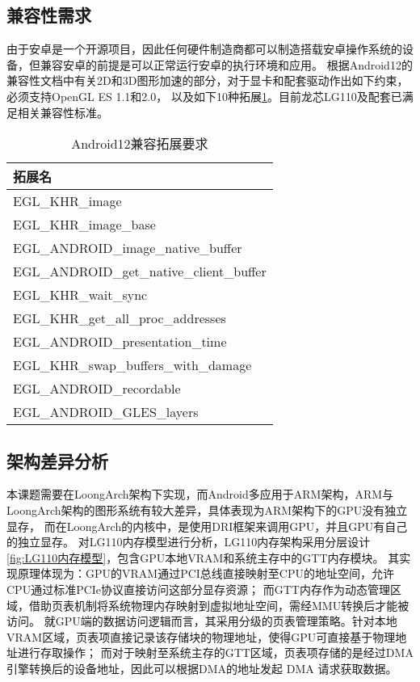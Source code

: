 \subsection{兼容性需求}
由于安卓是一个开源项目，因此任何硬件制造商都可以制造搭载安卓操作系统的设备，但兼容安卓的前提是可以正常运行安卓的执行环境和应用。
根据Android12的兼容性文档\cite{Android12CDD}中有关2D和3D图形加速的部分，对于显卡和配套驱动作出如下约束，必须支持OpenGL ES 1.1和2.0，
以及如下10种拓展\ref{tab:Android12兼容拓展要求}。目前龙芯LG110及配套已满足相关兼容性标准。

\begin{table}[h]
  \centering
  \caption{Android12兼容拓展要求}
  \label{tab:Android12兼容拓展要求}
  \begin{tabular}{l}
    \toprule
    拓展名  \\
    \midrule
    EGL\_KHR\_image \\
    EGL\_KHR\_image\_base \\
    EGL\_ANDROID\_image\_native\_buffer \\
    EGL\_ANDROID\_get\_native\_client\_buffer \\
    EGL\_KHR\_wait\_sync \\
    EGL\_KHR\_get\_all\_proc\_addresses \\
    EGL\_ANDROID\_presentation\_time \\
    EGL\_KHR\_swap\_buffers\_with\_damage \\
    EGL\_ANDROID\_recordable \\
    EGL\_ANDROID\_GLES\_layers \\
    \bottomrule
  \end{tabular}
  \note{}
\end{table}

\subsection{架构差异分析}
\label{sec:架构差异分析}
本课题需要在LoongArch架构下实现，而Android多应用于ARM架构，ARM与LoongArch架构的图形系统有较大差异，具体表现为ARM架构下的GPU没有独立显存\cite{Inki2011}，
而在LoongArch的内核中，是使用DRI框架来调用GPU，并且GPU有自己的独立显存。
对LG110内存模型进行分析，LG110内存架构采用分层设计\ref{fig:LG110内存模型}，包含GPU本地VRAM和系统主存中的GTT内存模块。
其实现原理体现为：GPU的VRAM通过PCI总线直接映射至CPU的地址空间，允许CPU通过标准PCIe协议直接访问这部分显存资源；
而GTT内存作为动态管理区域，借助页表机制将系统物理内存映射到虚拟地址空间，需经MMU转换后才能被访问。
就GPU端的数据访问逻辑而言，其采用分级的页表管理策略。针对本地VRAM区域，页表项直接记录该存储块的物理地址，使得GPU可直接基于物理地址进行存取操作；
而对于映射至系统主存的GTT区域，页表项存储的是经过DMA引擎转换后的设备地址，因此可以根据DMA的地址发起 DMA 请求获取数据。

